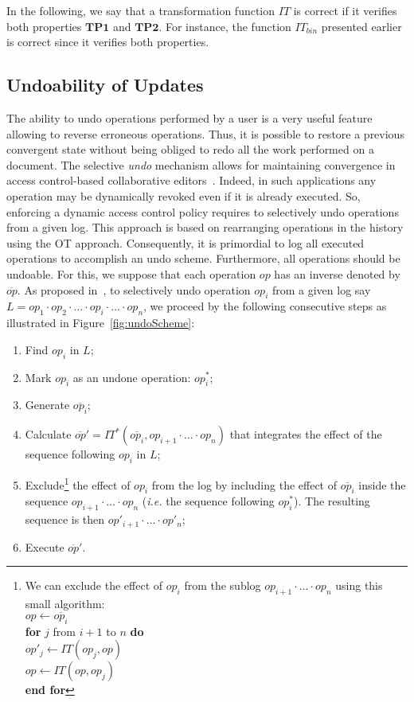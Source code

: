 \documentclass[submission,copyright,creativecommons]{eptcs}
\begin{document}
In the following, we say that a transformation function $IT$ is correct if it verifies both properties $\mathbf{TP1}$ and $\mathbf{TP2}$. 
For instance, the    function $IT_{bin}$ presented earlier  is correct since it verifies both properties.

\subsection{Undoability of Updates}\label{sec:undo}
The ability to undo operations performed by a user   is a   very useful feature allowing to reverse erroneous operations. Thus, it is possible to restore a previous convergent state without being obliged to redo all the work performed on a document.
  The selective \emph{undo} mechanism allows for maintaining convergence in access control-based collaborative editors~\cite{CherifIR11}. Indeed, in such applications any operation may be dynamically  revoked even if it is already executed. So, enforcing a dynamic access control policy requires to selectively undo operations from a given log. This approach  is based on rearranging operations in the history using the  OT approach. 
Consequently, it is primordial to log all executed operations to accomplish an undo scheme. Furthermore, all operations should be undoable. For this, we suppose that each operation $op$ has an inverse denoted by $\overline{op}$. As proposed in~\cite{Atul94,Sun02}, to
selectively undo operation $op_i$ from a given log say $L=op_1 \cdot op_2 \cdot \ldots \cdot op_i \cdot \ldots \cdot op_n$, we proceed by the following consecutive steps as illustrated in Figure~\ref{fig:undoScheme}:
\begin{enumerate}[(1)]
  \item Find $op_i$ in $L$;\vspace{-1.5mm}
  \item Mark $op_i$ as an undone operation: $op^*_i$;\vspace{-1.5mm}
  \item Generate $\overline{op_i}$;\vspace{-1.5mm}
  \item Calculate $\overline{op}'=IT^*(\overline{op_i}, op_{i+1} \cdot \ldots \cdot op_n)$ that integrates the effect of the sequence following $op_i$ in $L$;\vspace{-1.5mm}
  \item Exclude\footnote{We can exclude the effect of $op_i$ from the sublog $op_{i+1} \cdot \ldots \cdot op_n$ using this small algorithm:\\
  $op\leftarrow \overline{op_i}$\\
 \textbf{for} $j$ from $i+1$ to $n$ \textbf{do}\\
 $op'_{j} \leftarrow IT(op_j,op)$\\
 $op \leftarrow IT(op,op_j)$\\
 \textbf{end for}
  } the effect of $op_i$ from the log by including the effect of $\overline{op_i}$ inside the sequence
  $op_{i+1} \cdot \ldots \cdot op_n$ (\textit{i.e.} the sequence following $op^*_i$). 
  The resulting sequence   is then $op'_{i+1} \cdot \ldots \cdot op'_n$;\vspace{-1.5mm}
  \item Execute $\overline{op}'$.
\end{enumerate}
\end{document}
